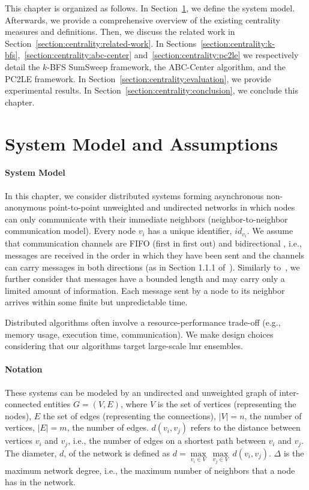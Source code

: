 This chapter is organized as follows. In Section~\ref{section:centrality:model}, we define the system model. Afterwards, we provide a comprehensive overview of the existing centrality measures and definitions. Then, we discuss the related work in Section~\ref{section:centrality:related-work}. In Sections~\ref{section:centrality:k-bfs},~\ref{section:centrality:abc-center} and~\ref{section:centrality:pc2le} we respectively detail the $k$-BFS SumSweep framework, the ABC-Center algorithm, and the PC2LE framework. In Section~\ref{section:centrality:evaluation}, we provide experimental results. In Section~\ref{section:centrality:conclusion}, we conclude this chapter.

\section{System Model and Assumptions}
\label{section:centrality:model}


\paragraph{System Model}
In this chapter, we consider distributed systems forming asynchronous non-anonymous point-to-point unweighted and undirected networks in which nodes can only communicate with their immediate neighbors (neighbor-to-neighbor communication model). Every node $v_i$ has a unique identifier, $id_{v_i}$. We assume that communication channels are FIFO (first in first out) and bidirectional , i.e., messages are received in the order in which they have been sent and the channels can carry messages in both directions (as in Section 1.1.1 of~\cite{raynal2013distributed}). Similarly to~\cite{awerbuch1985complexity}, we further consider that messages have a bounded length and may carry only a limited amount of information. Each message sent by a node to its neighbor arrives within some finite but unpredictable time.

Distributed algorithms often involve a resource-performance trade-off (e.g., memory usage, execution time, communication). We make design choices considering that our algorithms target large-scale \gls{lmr} ensembles.

\paragraph{Notation}
These systems can be modeled by an undirected and unweighted graph of inter-connected entities $G = (V, E)$, where $V$ is the set of vertices (representing the nodes), $E$ the set of edges (representing the connections), $|V|=n$, the number of vertices, $|E|= m$, the number of edges. $d(v_i,v_j)$ refers to the distance between vertices $v_i$ and $v_j$, i.e., the number of edges on a shortest path between $v_i$ and $v_j$. The diameter, $d$, of the network is defined as $d = \max\limits_{v_i \in V}\ \max\limits_{v_j \in V}\  d(v_i,v_j)$. $\Delta$ is the maximum network degree, i.e., the maximum number of neighbors that a node has in the network.

